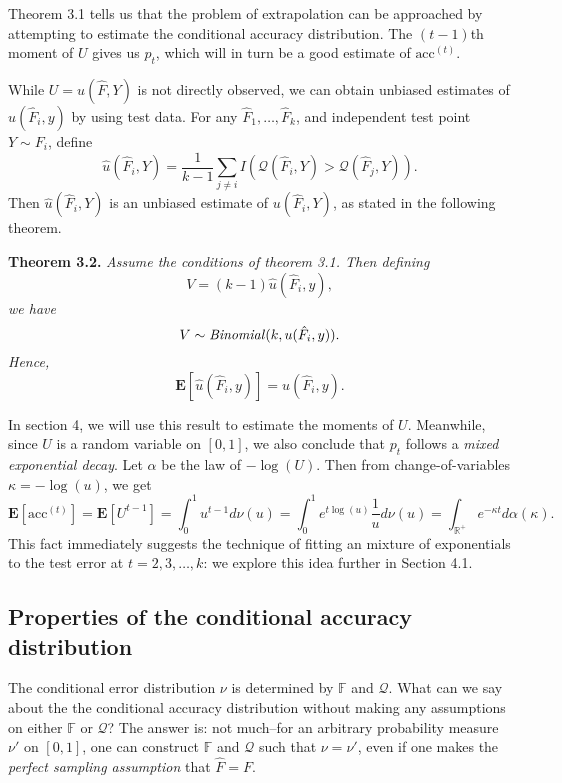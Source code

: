 \documentclass{article}
\newcommand{\E}{\textbf{E}}
\begin{document}
Theorem 3.1 tells us that the problem of extrapolation can be
approached by attempting to estimate the conditional accuracy
distribution.  The $(t-1)$th moment of $U$ gives us $p_t$, which will
in turn be a good estimate of $\text{acc}^{(t)}$.

While $U = u(\hat{F}, Y)$ is not directly observed, we can obtain unbiased estimates of $u(\hat{F}_i, y)$
by using test data.  For any $\hat{F}_1,\hdots, \hat{F}_k$, and independent test point $Y \sim F_i$, define
\begin{equation}\label{eq:hatu}
\hat{u}(\hat{F}_i, Y) = \frac{1}{k -1}\sum_{j \neq i} I(\mathcal{Q}(\hat{F}_i, Y) > \mathcal{Q}(\hat{F}_j, Y)).
\end{equation}
Then $\hat{u}(\hat{F}_i, Y)$ is an unbiased estimate of $u(\hat{F}_i, Y)$, as stated in the following theorem.

\noindent\textbf{Theorem 3.2.}\emph{
Assume the conditions of theorem 3.1.
Then defining 
\begin{equation}\label{eq:veq}
V = (k-1)\hat{u}(\hat{F}_i, y),\end{equation}
we have
\[V \sim \text{\emph{Binomial}}(k, u(\hat{F}_i, y)).\]
Hence,
\[\E[\hat{u}(\hat{F}_i, y)] = u(\hat{F}_i, y).\]
}

In section 4, we will use this result to estimate the moments of $U$.
Meanwhile, since $U$ is a random variable on $[0, 1]$, we also conclude that $p_t$ follows a \emph{mixed exponential decay}.
Let $\alpha$ be the law of $-\log(U)$.
Then from change-of-variables $\kappa =-\log(u)$, we get
\[\E[\text{acc}^{(t)}] = \E[U^{t-1}] = 
\int_0^1 u^{t-1} d\nu(u) = \int_0^1 e^{t\log(u)} \frac{1}{u}d\nu(u) = 
\int_{\mathbb{R}^{+}} e^{-\kappa t} d\alpha(\kappa).\]
This fact immediately suggests the technique of fitting an mixture of exponentials to the test error at $t =2,3,\hdots, k$:
we explore this idea further in Section 4.1.

\subsection{Properties of the conditional accuracy distribution}

The conditional error distribution $\nu$ is determined by $\mathbb{F}$
and $\mathcal{Q}$.  What can we say about the the conditional accuracy
distribution without making any assumptions on either $\mathbb{F}$ or
$\mathcal{Q}$?  The answer is: not much--for an arbitrary probability
measure $\nu'$ on $[0,1]$, one can construct $\mathbb{F}$ and
$\mathcal{Q}$ such that $\nu = \nu'$, even if one makes the \emph{perfect sampling assumption} that $\hat{F}=F.$
\end{document}
